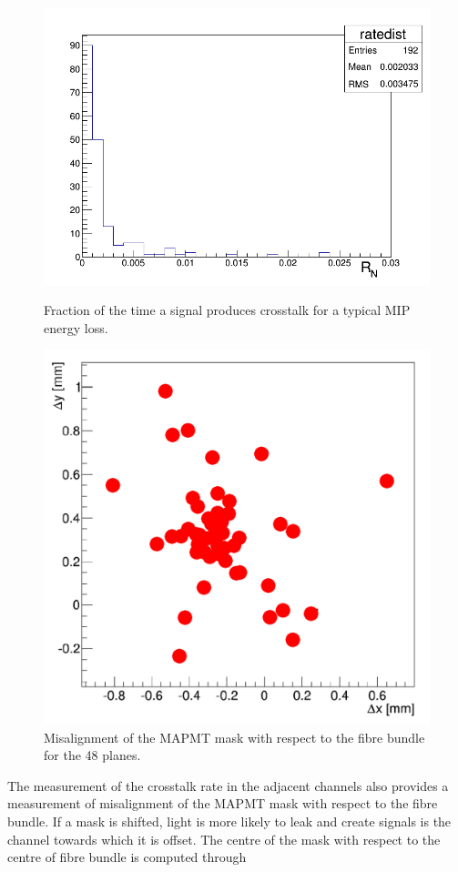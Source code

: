 \documentclass[a4paper,11pt]{article}
\begin{document}
\begin{figure}[htr!]
  \begin{minipage}[b]{.49\textwidth}
   \centering
   \includegraphics[width=\textwidth]{ratedist.png}
   \caption{Fraction of the time a signal produces crosstalk for a typical MIP energy loss.}
   \label{fig:rate_dist}
  \end{minipage}
  \begin{minipage}[b]{.49\textwidth}
   \centering
   \includegraphics[width=.7\textwidth]{misalignment.jpg}
   \caption{Misalignment of the MAPMT mask with respect to the fibre bundle for the 48 planes.}
   \label{fig:misalignment}
  \end{minipage}
\end{figure}

The measurement of the crosstalk rate in the adjacent channels also provides a measurement of misalignment of the MAPMT mask with respect to the fibre bundle. If a mask is shifted, light is more likely to leak and create signals is the channel towards which it is offset. The centre of the mask with respect to the centre of fibre bundle is computed through
\end{document}
